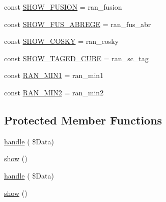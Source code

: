 \begin{DoxyCompactItemize}
\item 
const \hyperlink{class_page_run_analysis_a90aabe35480aab7571dbfbb970826712}{S\+H\+O\+W\+\_\+\+F\+U\+S\+I\+ON} = \textquotesingle{}ran\+\_\+fusion\textquotesingle{}
\item 
const \hyperlink{class_page_run_analysis_ab35dfb3370483c7ff2f6eeda6f854df9}{S\+H\+O\+W\+\_\+\+F\+U\+S\+\_\+\+A\+B\+R\+E\+GE} = \textquotesingle{}ran\+\_\+fus\+\_\+abr\textquotesingle{}
\item 
const \hyperlink{class_page_run_analysis_adf5095535d952008e0af01cfa3ba1c4f}{S\+H\+O\+W\+\_\+\+C\+O\+S\+KY} = \textquotesingle{}ran\+\_\+cosky\textquotesingle{}
\item 
const \hyperlink{class_page_run_analysis_a857fc7cac06f788855999fbcfcf1c6a3}{S\+H\+O\+W\+\_\+\+T\+A\+G\+E\+D\+\_\+\+C\+U\+BE} = \textquotesingle{}ran\+\_\+sc\+\_\+tag\textquotesingle{}
\item 
const \hyperlink{class_page_run_analysis_ac300c4c2a0bb30314f3aa7c045deb693}{R\+A\+N\+\_\+\+M\+I\+N1} = \textquotesingle{}ran\+\_\+min1\textquotesingle{}
\item 
const \hyperlink{class_page_run_analysis_add2ff907e601ee1d7f2339ba4c75cecc}{R\+A\+N\+\_\+\+M\+I\+N2} = \textquotesingle{}ran\+\_\+min2\textquotesingle{}
\end{DoxyCompactItemize}
\subsection*{Protected Member Functions}
\begin{DoxyCompactItemize}
\item 
\hyperlink{class_page_run_analysis_a568bf81b0bfacd815f07ef353836b64c}{handle} ( \$Data)
\item 
\hyperlink{class_page_run_analysis_acd5e0e94b4fc228110dc253569437ae2}{show} ()
\item 
\hyperlink{class_page_run_analysis_a568bf81b0bfacd815f07ef353836b64c}{handle} ( \$Data)
\item 
\hyperlink{class_page_run_analysis_acd5e0e94b4fc228110dc253569437ae2}{show} ()
\end{DoxyCompactItemize}
